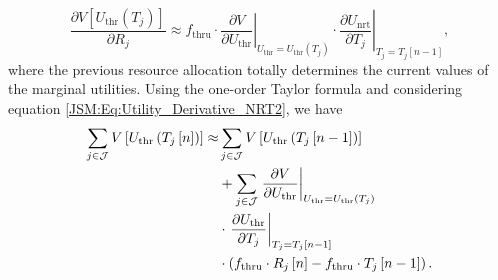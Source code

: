 \begin{apendicesenv}
\begin{equation}
\label{JSM:Eq:Utility_Derivative_NRT2}
\frac{\partial V\left[U_{\mathrm{thr}}\left(T_j\right)\right]}{\partial R_{j}} \approx
f_{\mathrm{thru}}
\cdot
\left.\dfrac{\partial V}{\partial U_{\mathrm{thr}}}\right\vert_{U_{\mathrm{thr}} = U_{\mathrm{thr}}\left(T_{j}\right)}
\cdot
\left.\dfrac{\partial U_{\mathrm{nrt}}}{\partial T_j}\right\vert_{T_j = T_{j}\left[n-1\right]},
\end{equation}
%
where the previous resource allocation totally determines the current values of the marginal utilities. Using the one-order Taylor formula \cite{Art:Song2005_p2, Phd:Emanuel2011} and considering equation \eqref{JSM:Eq:Utility_Derivative_NRT2}, we have
%
\begin{align}
\label{JSM:Eq:Taylor_NRT}
\sum_{j \in \mathcal{J}} V\left[U_{\mathrm{thr}}\left(T_{j}\left[n\right]\right)\right] \approx &
\sum_{j \in \mathcal{J}} V\left[U_{\mathrm{thr}}\left(T_{j}\left[n-1\right]\right)\right] \notag\\
& + \sum_{j \in \mathcal{J}} \left.\dfrac{\partial V}{\partial U_{\mathrm{thr}}}\right\vert_{U_{\mathrm{thr}} = U_{\mathrm{thr}}\left(T_{j}\right)} \notag \\ & \cdot \left.\dfrac{\partial U_{\mathrm{thr}}}{\partial T_j}\right\vert_{T_j = T_{j}\left[n-1\right]} \notag \\ & \cdot \left(f_{\mathrm{thru}} \cdot R_j\left[n\right] - f_{\mathrm{thru}} \cdot T_j\left[n-1\right]\right).
\end{align}


\end{apendicesenv}
